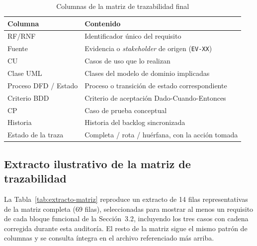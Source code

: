\documentclass[11pt,a4paper]{article}
\newcommand{\id}[1]{\texttt{#1}}
\begin{document}
\begin{table}[!htbp]
\centering
\caption{Columnas de la matriz de trazabilidad final}
\label{tab:matriz-cols}
\begin{tabular}{|L{2.6cm}|L{10.6cm}|}
\hline
{}\textbf{Columna} & \textbf{Contenido} \\ \hline
RF/RNF & Identificador único del requisito \\ \hline
Fuente & Evidencia o \emph{stakeholder} de origen (\id{EV-XX}) \\ \hline
CU & Casos de uso que lo realizan \\ \hline
Clase UML & Clases del modelo de dominio implicadas \\ \hline
Proceso DFD / Estado & Proceso o transición de estado correspondiente \\ \hline
Criterio BDD & Criterio de aceptación Dado-Cuando-Entonces \\ \hline
CP & Caso de prueba conceptual \\ \hline
Historia & Historia del backlog sincronizada \\ \hline
Estado de la traza & Completa / rota / huérfana, con la acción tomada \\ \hline
\end{tabular}
\end{table}

\subsection{Extracto ilustrativo de la matriz de trazabilidad}

La Tabla~\ref{tab:extracto-matriz} reproduce un extracto de 14 filas representativas de la matriz
completa (69 filas), seleccionadas para mostrar al menos un requisito de cada bloque funcional de
la Sección~3.2, incluyendo los tres casos con cadena corregida durante esta auditoría. El resto de
la matriz sigue el mismo patrón de columnas y se consulta íntegra en el archivo referenciado más
arriba.
\end{document}
